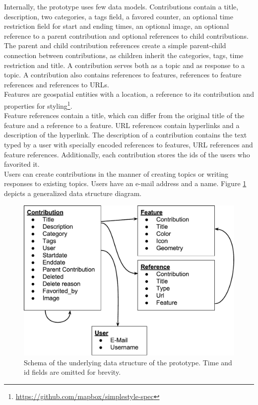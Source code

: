 Internally, the prototype uses few data models. Contributions contain a title, description, two categories, a tags field, a favored counter, an optional time restriction field for start and ending times, an optional image, an optional reference to a parent contribution and optional references to child contributions. The parent and child contribution references create a simple parent-child connection between contributions, as children inherit the categories, tags, time restriction and title. A contribution serves both as a topic and as response to a topic. A contribution also contains references to features, references to feature references and references to URLs.\\
Features are geospatial entities with a location, a reference to its contribution and properties for styling\footnote{\url{https://github.com/mapbox/simplestyle-spec}}.\\
Feature references contain a title, which can differ from the original title of the feature and a reference to a feature. URL references contain hyperlinks and a description of the hyperlink. The description of a contribution contains the text typed by a user with specially encoded references to features, URL references and feature references. Additionally, each contribution stores the ids of the users who favorited it.\\
Users can create contributions in the manner of creating topics or writing responses to existing topics. Users have an e-mail address and a name. Figure \ref{fig:data_structure} depicts a generalized data structure diagram.

\begin{figure}[!h]
    \centering
    \includegraphics[width=1\columnwidth]{images/data_structure}
    \caption{Schema of the underlying data structure of the prototype. Time and id fields are omitted for brevity.}
    \label{fig:data_structure}
\end{figure}

